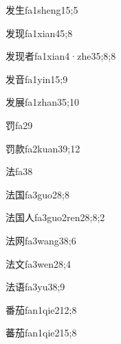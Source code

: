 \begin{verbete}{发生}{fa1sheng1}{5;5}
\end{verbete}
\begin{verbete}{发现}{fa1xian4}{5;8}
\end{verbete}
\begin{verbete}{发现者}{fa1xian4·zhe3}{5;8;8}
\end{verbete}
\begin{verbete}{发音}{fa1yin1}{5;9}
\end{verbete}
\begin{verbete}{发展}{fa1zhan3}{5;10}
\end{verbete}
\begin{verbete}{罚}{fa2}{9}
\end{verbete}
\begin{verbete}{罚款}{fa2kuan3}{9;12}
\end{verbete}
\begin{verbete}{法}{fa3}{8}
\end{verbete}
\begin{verbete}{法国}{fa3guo2}{8;8}
\end{verbete}
\begin{verbete}{法国人}{fa3guo2ren2}{8;8;2}
\end{verbete}
\begin{verbete}{法网}{fa3wang3}{8;6}
\end{verbete}
\begin{verbete}{法文}{fa3wen2}{8;4}
\end{verbete}
\begin{verbete}{法语}{fa3yu3}{8;9}
\end{verbete}
\begin{verbete}{番茄}{fan1qie2}{12;8}
\end{verbete}
\begin{verbete}{蕃茄}{fan1qie2}{15;8}
\end{verbete}
